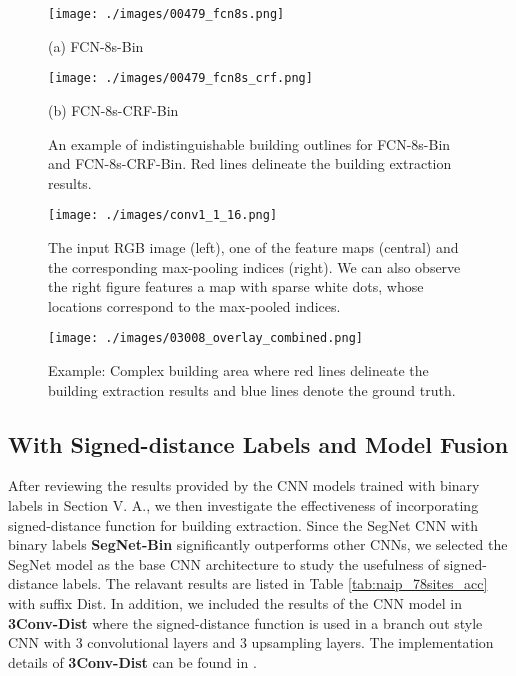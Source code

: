 \documentclass[journal]{IEEEtran}
\begin{document}
\begin{figure}[htb]
	
	\begin{minipage}[b]{0.46\linewidth}
		\centering
		\centerline{\texttt{[image: ./images/00479\_fcn8s.png]}}
		\centerline{(a) FCN-8s-Bin}\medskip
	\end{minipage}
	\begin{minipage}[b]{0.46\linewidth}
		\centering
		\centerline{\texttt{[image: ./images/00479\_fcn8s\_crf.png]}}
		\centerline{(b) FCN-8s-CRF-Bin}\medskip
	\end{minipage}
	
	\caption{\label{fig:fail_fcn}An example of indistinguishable building outlines for FCN-8s-Bin and FCN-8s-CRF-Bin. Red lines delineate the  building extraction results.}
	
\end{figure}

\begin{figure}[t!]
	\texttt{[image: ./images/conv1\_1\_16.png]}
	\caption{The input RGB image (left), one of the feature maps (central) and the corresponding max-pooling indices (right). We can also observe the right figure features a map with sparse white dots, whose locations correspond to the max-pooled indices.} 
	\label{fig:segnet_bin_index_ex}
\end{figure}
\begin{figure*}
	\texttt{[image: ./images/03008\_overlay\_combined.png]}
	\caption{Example: Complex building area where red lines delineate the building extraction results and blue lines denote the ground truth.}
	\label{fig:res_complex}
\end{figure*}

\subsection{With Signed-distance Labels and Model Fusion}
After reviewing the results provided by the CNN models trained with binary labels in Section V. A., we then investigate the effectiveness of incorporating signed-distance function for building extraction. Since the SegNet CNN with binary labels \textbf{SegNet-Bin} significantly outperforms other CNNs, we selected the SegNet model as the base CNN architecture to study the usefulness of signed-distance labels. The relavant results are listed in Table \ref{tab:naip_78sites_acc} with suffix Dist. In addition, we included the results of the CNN model in \cite{Yuan2018} \textbf{3Conv-Dist} where the signed-distance function is used in a branch out style CNN with 3 convolutional layers and 3 upsampling layers. The implementation details of \textbf{3Conv-Dist} can be found in \cite{Yuan2018}.
\end{document}
